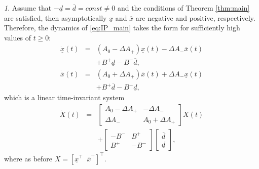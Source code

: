 \documentclass[letterpaper, 10 pt, conference]{ieeeconf}
\theoremstyle{plain}
\theoremstyle{definition}
\theoremstyle{plain}
\theoremstyle{plain}
\theoremstyle{remark}
\newtheorem{rem}{\protect\remarkname}
\providecommand{\remarkname}{Remark}
\begin{document}
\begin{rem}
Assume that $-\underline{d}=\overline{d}=const\ne0$ and the conditions of Theorem \ref{thm:main} are satisfied, then asymptotically $\underline{x}$ and $\overline{x}$ are negative and positive, respectively. Therefore, the dynamics of \eqref{eq:IP_main} takes the form for sufficiently high values of $t\geq0$:
\begin{eqnarray*}
\dot{\underline{x}}(t) & = & (A_{0}-\Delta A_{+})\underline{x}(t)-\Delta A_{-}\overline{x}(t)\\
 &  & +B^{+}\underline{d}-B^{-}\overline{d},\\
\dot{\overline{x}}(t) & = & (A_{0}+\Delta A_{+})\overline{x}(t)+\Delta A_{-}\underline{x}(t)\\
 &  & +B^{+}\overline{d}-B^{-}\underline{d},
\end{eqnarray*}
which is a linear time-invariant system
\begin{eqnarray}
\label{eq:linear-asympt}
\dot{X}(t) & = & \left[\begin{array}{cc}
A_{0}-\Delta A_{+} & -\Delta A_{-}\\
\Delta A_{-} & A_{0}+\Delta A_{+}
\end{array}\right]X(t)\\
 &  & +\left[\begin{array}{cc}
-B^{-} & B^{+}\\
B^{+} & -B^{-}
\end{array}\right]\left[\begin{array}{c}
\overline{d}\\
\underline{d}
\end{array}\right],
\end{eqnarray}
where as before $X=[\underline{x}^{\top}\;\;\overline{x}^{\top}]^{\top}$.
\end{rem}
\end{document}
